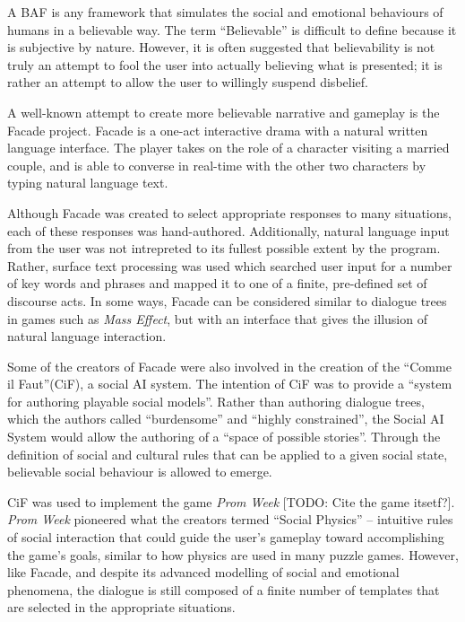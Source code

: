 \documentclass{article}
\begin{document}
A BAF is any framework that simulates the social and emotional
behaviours of humans in a believable way.  The term ``Believable'' is
difficult to define because it is subjective by nature.  However, it
is often suggested that believability is not truly an attempt to fool
the user into actually believing what is presented; it is rather an
attempt to allow the user to willingly suspend disbelief. \cite{Acton2009}

A well-known attempt to create more believable narrative and gameplay
is the Facade
project\cite{Mateas}.  Facade is a one-act interactive drama with a
natural written language interface.  The player takes on the role of a
character visiting a married couple, and is able to converse in
real-time with the other two characters by typing natural language
text.

Although Facade was created to select appropriate responses to many
situations, each of these responses was hand-authored.  Additionally,
natural language input from the user was not intrepreted to its
fullest possible extent by the program.  Rather, surface text
processing was used which searched user input for a number of key
words and phrases and mapped it to one of a finite, pre-defined set of
discourse acts. \cite{Mateasa}  In some ways, Facade can be considered
similar to dialogue trees in games such as \emph{Mass Effect}, but with an
interface that gives the illusion of natural language interaction.

Some of the creators of Facade were also involved in the
creation of the ``Comme il Faut''(CiF)\cite{Mccoy2010}, a social AI
system.  The intention of CiF was to provide a ``system for authoring playable social
models''\cite{Mccoy2010}.  Rather than authoring dialogue trees, which
the authors called ``burdensome''  and ``highly constrained'', the
Social AI System  would allow the authoring of a ``space of possible
stories''.  Through the definition of social and cultural rules that
can be applied to a given social state, believable social behaviour is
allowed to emerge.

CiF was used to implement the game \emph{Prom Week} [TODO: Cite the
  game itsetf?].  \emph{Prom Week} pioneered what the creators termed ``Social
Physics''\cite{Mccoy2011} -- intuitive rules of social
interaction that could guide the user's gameplay toward accomplishing
the game's goals, similar to how physics are used in many puzzle
games.  However, like Facade, and despite its advanced modelling of
social and emotional phenomena, the dialogue is still composed of a
finite number of templates that are selected in the appropriate
situations.
\end{document}
